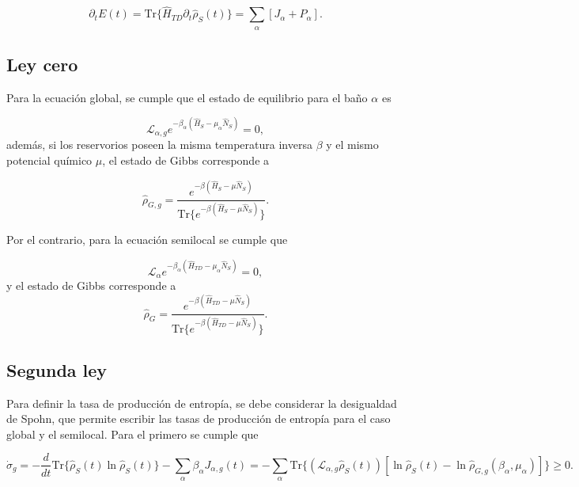 \begin{equation*}
    \partial_{t}E(t) = \text{Tr}\{ \hat{H}_{TD}\partial_{t}\hat{\rho}_{S}(t) \} = \sum_{\alpha}[J_{\alpha} + P_{\alpha}].
\end{equation*}

\subsection{Ley cero}
Para la ecuación global, se cumple que el estado de equilibrio para el baño $\alpha$ es 

\begin{equation*}
    \mathcal{L}_{\alpha,g}e^{-\beta_{\alpha}(\hat{H}_{S} - \mu_{\alpha}\hat{N}_{S})} = 0,
\end{equation*}
además, si los reservorios poseen la misma temperatura inversa $\beta$ y el mismo potencial químico $\mu$, el estado de Gibbs corresponde a

\begin{equation*}
    \hat{\rho}_{G,g} = \frac{e^{-\beta(\hat{H}_{S} - \mu \hat{N}_{S})}}{\text{Tr}\{ e^{-\beta(\hat{H}_{S} - \mu \hat{N}_{S})}\}}.
\end{equation*}

Por el contrario, para la ecuación semilocal se cumple que

\begin{equation}
    \mathcal{L}_{\alpha}e^{-\beta_{\alpha}(\hat{H}_{TD} - \mu_{\alpha}\hat{N}_{S})} = 0,
\label{sec2cerolaw}
\end{equation}
y el estado de Gibbs corresponde a 
\begin{equation*}
    \hat{\rho}_{G} = \frac{e^{-\beta(\hat{H}_{TD} - \mu \hat{N}_{S})}}{\text{Tr}\{ e^{-\beta(\hat{H}_{TD} - \mu \hat{N}_{S})}\}}.
\end{equation*}

\subsection{Segunda ley}
Para definir la tasa de producción de entropía, se debe considerar la desigualdad de Spohn\cite{spohn2007irreversible}, que permite escribir las tasas de producción de entropía para el caso global y el semilocal\cite{potts2021thermodynamically}. Para el primero se cumple que 

\begin{equation*}
    \dot{\sigma}_{g} = - \frac{d}{dt}\text{Tr}\{\hat{\rho}_{S}(t) \ln \hat{\rho}_{S}(t) \} - \sum_{\alpha} \beta_{\alpha} J_{\alpha,g}(t) = -\sum_{\alpha} \text{Tr}\{(\mathcal{L}_{\alpha,g}\hat{\rho}_{S}(t))[\ln \hat{\rho}_{S}(t) - \ln \hat{\rho}_{G,g}(\beta_{\alpha},\mu_{\alpha})] \} \geq 0.
\end{equation*}

